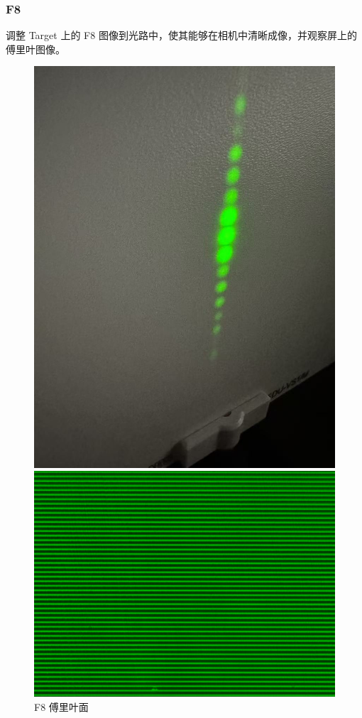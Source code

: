 \documentclass{ctexart}
\begin{document}
\subsubsection{F8}
调整 Target 上的 F8 图像到光路中，使其能够在相机中清晰成像，并观察屏上的傅里叶图像。
\begin{figure}[H]
  \centering
  \begin{minipage}[b]{0.2\textwidth}
    \centering
    \includegraphics[width=\textwidth]{pictures/微信图片_20241017164844.jpg}
    \caption{F8 傅里叶面}
  \end{minipage}
  \hspace{0.1\textwidth} %
  \begin{minipage}[b]{0.3\textwidth}
    \centering
    \includegraphics[width=\textwidth]{pictures/F8-nomask.png}

\end{minipage}
\end{figure}
\end{document}
